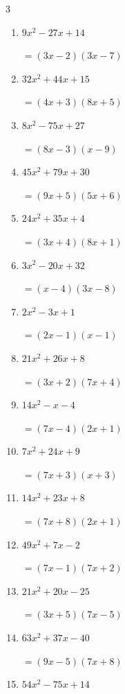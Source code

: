 \begin{multicols}{3}
\begin{enumerate}
        $=(5x+8)(x+3)$

  \item $9x^{2}-27x+14$

        $=(3x-2)(3x-7)$

  \item $32x^{2}+44x+15$

        $=(4x+3)(8x+5)$

  \item $8x^{2}-75x+27$

        $=(8x-3)(x-9)$

  \item $45x^{2}+79x+30$

        $=(9x+5)(5x+6)$

  \item $24x^{2}+35x+4$

        $=(3x+4)(8x+1)$

\columnbreak %

  \item $3x^{2}-20x+32$

        $=(x-4)(3x-8)$

  \item $2x^{2}-3x+1$

        $=(2x-1)(x-1)$

  \item $21x^{2}+26x+8$

        $=(3x+2)(7x+4)$

  \item $14x^{2}-x-4$

        $=(7x-4)(2x+1)$

  \item $7x^{2}+24x+9$

        $=(7x+3)(x+3)$

  \item $14x^{2}+23x+8$

        $=(7x+8)(2x+1)$

  \item $49x^{2}+7x-2$

        $=(7x-1)(7x+2)$

  \item $21x^{2}+20x-25$

        $=(3x+5)(7x-5)$

  \item $63x^{2}+37x-40$

        $=(9x-5)(7x+8)$

  \item $54x^{2}-75x+14$


\end{enumerate}
\end{multicols}
